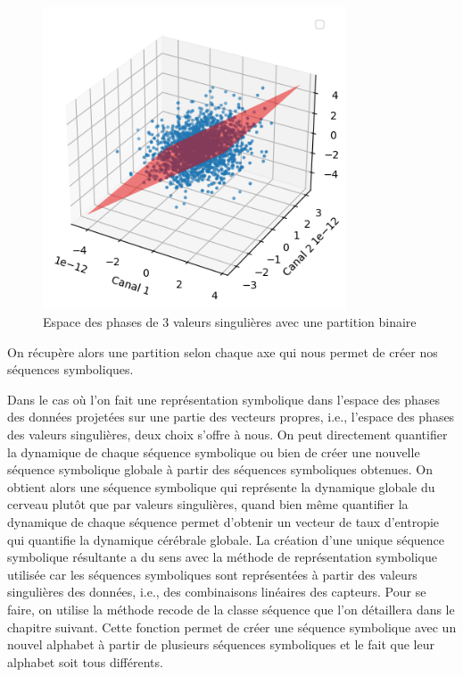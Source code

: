 \begin{figure}[!ht]
    \centering
    \includegraphics[width=9cm]{representation_espace_des_phases.png}
    \caption{Espace des phases de 3 valeurs singulières avec une partition binaire}
    \label{fig4.4}
\end{figure}

On récupère alors une partition selon chaque axe qui nous permet de créer nos séquences symboliques. 

\vspace{2ex}
Dans le cas où l'on fait une représentation symbolique dans l'espace des phases des données projetées sur une partie des vecteurs propres, i.e., l'espace des phases des valeurs singulières, deux choix s'offre à nous. On peut directement quantifier la dynamique de chaque séquence symbolique ou bien de créer une nouvelle séquence symbolique globale à partir des séquences symboliques obtenues. On obtient alors une séquence symbolique qui représente la dynamique globale du cerveau plutôt que par valeurs singulières, quand bien même quantifier la dynamique de chaque séquence permet d'obtenir un vecteur de taux d'entropie qui quantifie la dynamique cérébrale globale. La création d'une unique séquence symbolique résultante a du sens avec la méthode de représentation symbolique utilisée car les séquences symboliques sont représentées à partir des valeurs singulières des données, i.e., des combinaisons linéaires des capteurs. Pour se faire, on utilise la méthode recode de la classe séquence que l'on détaillera dans le chapitre suivant. Cette fonction permet de créer une séquence symbolique avec un nouvel alphabet à partir de plusieurs séquences symboliques et le fait que leur alphabet soit tous différents.
 
